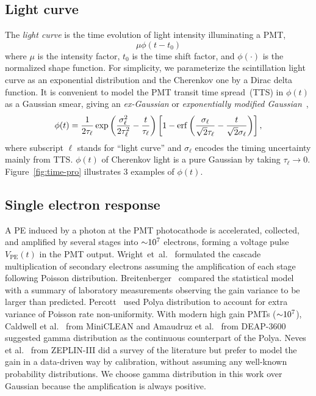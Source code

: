 \subsection{Light curve}
\label{sec:lc}
The \textit{light curve} is the time evolution of light intensity illuminating a PMT,
\begin{equation}
  \label{eq:light-curve}
  \mu\phi(t-t_0)
\end{equation}
where $\mu$ is the intensity factor, $t_0$ is the time shift factor, and $\phi(\cdot)$ is the normalized shape function. For simplicity, we parameterize the scintillation light curve as an exponential distribution and the Cherenkov one by a Dirac delta function.  It is convenient to model the PMT transit time spread~(TTS) in $\phi(t)$ as a Gaussian smear, giving an \textit{ex-Gaussian} or \textit{exponentially modified Gaussian}~\cite{li_separation_2016},
\begin{align}
    \phi(t) = \frac{1}{2\tau_\ell} \exp\left(\frac{\sigma_\ell^2}{2\tau_\ell^2}-\frac{t}{\tau_\ell}\right) \left[1 - \operatorname{erf}\left( \frac{\sigma_\ell}{\sqrt{2}\tau_\ell} - \frac{t}{\sqrt{2}\sigma_\ell} \right)\right],
    \label{eq:time-pro}
\end{align}
where subscript $\ell$ stands for ``light curve'' and $\sigma_\ell$ encodes the timing uncertainty mainly from TTS. $\phi(t)$ of Cherenkov light is a pure Gaussian by taking $\tau_\ell \rightarrow 0$. Figure~\ref{fig:time-pro} illustrates 3 examples of $\phi(t)$. 

\subsection{Single electron response}
\label{subsec:spe}

A PE induced by a photon at the PMT photocathode is accelerated, collected, and amplified by several stages into $\num[retain-unity-mantissa=false]{\sim 1e7}$ electrons, forming a voltage pulse $V_\mathrm{PE}(t)$ in the PMT output.  Wright~et~al.~\cite{wright_low_1954} formulated the cascade multiplication of secondary electrons assuming the amplification of each stage following Poisson distribution.  Breitenberger~\cite{breitenberger_scintillation_1955} compared the statistical model with a summary of laboratory measurements observing the gain variance to be larger than predicted. Percott~\cite{prescott_statistical_1966} used Polya distribution to account for extra variance of Poisson rate non-uniformity.  With modern high gain PMTs ($\num[retain-unity-mantissa=false]{\sim 1e7}$), Caldwell et al.~\cite{caldwell_characterization_2013} from MiniCLEAN and Amaudruz et al.~\cite{amaudruz_-situ_2019} from DEAP-3600 suggested gamma distribution as the continuous counterpart of the Polya.  Neves et al.~\cite{neves_calibration_2010} from ZEPLIN-III did a survey of the literature but prefer to model the gain in a data-driven way by calibration, without assuming any well-known probability distributions.  We choose gamma distribution in this work over Gaussian because the amplification is always positive.

